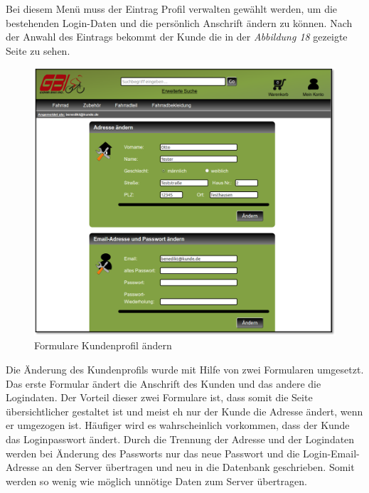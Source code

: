 Bei diesem Menü muss der Eintrag \glqq Profil verwalten\grqq{} gewählt werden, um die bestehenden Login-Daten und die persönlich Anschrift ändern zu können. Nach der Anwahl des Eintrags bekommt der Kunde die in der \textit{Abbildung 18} gezeigte Seite zu sehen.
\begin{figure}[H]
	\begin{center}
			\includegraphics[width=130mm]{Bilder/formulare_profil_aendern.png}
	\end{center}
	\caption{Formulare Kundenprofil ändern}
\end{figure}
Die Änderung des Kundenprofils wurde mit Hilfe von zwei Formularen umgesetzt. Das erste Formular ändert die Anschrift des Kunden und das andere die Logindaten. Der Vorteil dieser zwei Formulare ist, dass somit die Seite übersichtlicher gestaltet ist und meist eh nur der Kunde die Adresse ändert, wenn er umgezogen ist. Häufiger wird es wahrscheinlich vorkommen, dass der Kunde das Loginpasswort ändert. Durch die Trennung der Adresse und der Logindaten werden bei Änderung des Passworts nur das neue Passwort und die Login-Email-Adresse an den Server übertragen und neu in die Datenbank geschrieben. Somit werden so wenig wie möglich unnötige Daten zum Server übertragen.\\
